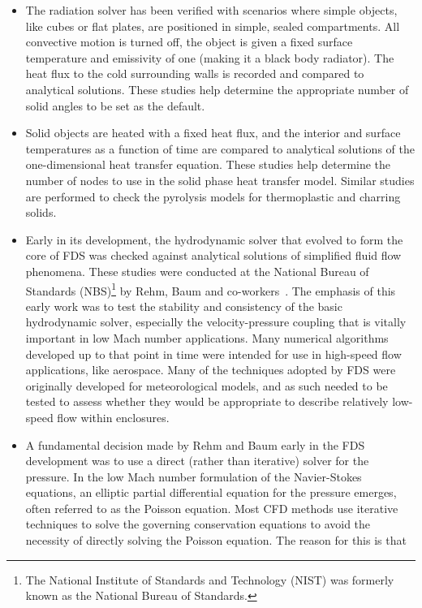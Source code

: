 \documentclass[11pt]{book}
\begin{document}
\begin{itemize}
\item The radiation solver has been verified with scenarios where
simple objects, like cubes or flat plates, are positioned in simple, sealed compartments. All convective motion is turned off, the object is given a
fixed surface temperature and emissivity of one (making it a black body radiator). The heat flux to the cold surrounding walls is recorded and
compared to analytical solutions.  These studies help determine the appropriate number of solid angles to be set as the default.
\item Solid objects are heated with a fixed heat flux, and the
interior and surface temperatures as a function of time are compared to analytical solutions of the one-dimensional heat transfer equation. These
studies help determine the number of nodes to use in the solid phase heat transfer model. Similar studies are performed to check the pyrolysis models
for thermoplastic and charring solids.
\item Early in its development, the hydrodynamic solver that evolved
to form the core of FDS was checked against analytical solutions of simplified fluid flow phenomena. These studies were conducted at the National
Bureau of Standards (NBS)\footnote{The National Institute of Standards and Technology (NIST) was formerly known as the National Bureau of Standards.}
by Rehm, Baum and co-workers~\cite{Rehm:SIAM83,Rehm:SIAM84,Baum:CST84,Rehm:ANM85}. The emphasis of this early work was to test the stability and
consistency of the basic hydrodynamic solver, especially the velocity-pressure coupling that is vitally important in low Mach number applications.
Many numerical algorithms developed up to that point in time were intended for use in high-speed flow applications, like aerospace. Many of the
techniques adopted by FDS were originally developed for meteorological models, and as such needed to be tested to assess whether they would be
appropriate to describe relatively low-speed flow within enclosures.
\item A fundamental decision made by Rehm and Baum early in the FDS
development was to use a direct (rather than iterative) solver for the pressure. In the low Mach number formulation of the Navier-Stokes equations,
an elliptic partial differential equation for the pressure emerges, often referred to as the Poisson equation. Most CFD methods use iterative
techniques to solve the governing conservation equations to avoid the necessity of directly solving the Poisson equation. The reason for this is that

\end{itemize}
\end{document}
